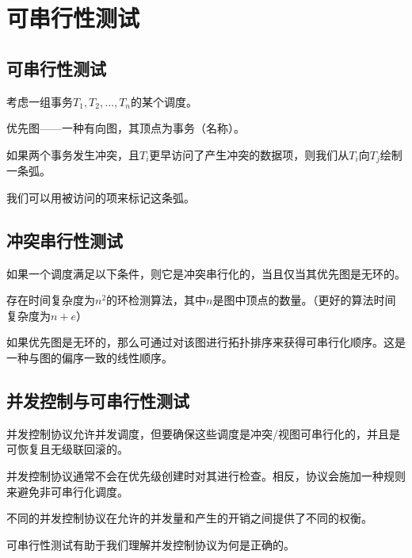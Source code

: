 \section{可串行性测试}
\subsection{可串行性测试}

考虑一组事务$T_1,T_2,...,T_n$的某个调度。

优先图——一种有向图，其顶点为事务（名称）。

如果两个事务发生冲突，且$T_i$更早访问了产生冲突的数据项，则我们从$T_i$向$T_j$绘制一条弧。

我们可以用被访问的项来标记这条弧。

\subsection{冲突串行性测试}

如果一个调度满足以下条件，则它是冲突串行化的，当且仅当其优先图是无环的。

存在时间复杂度为$n^2$的环检测算法，其中$n$是图中顶点的数量。（更好的算法时间复杂度为$n+e$）

如果优先图是无环的，那么可通过对该图进行拓扑排序来获得可串行化顺序。这是一种与图的偏序一致的线性顺序。

\subsection{并发控制与可串行性测试}

并发控制协议允许并发调度，但要确保这些调度是冲突/视图可串行化的，并且是可恢复且无级联回滚的。

并发控制协议通常不会在优先级创建时对其进行检查。相反，协议会施加一种规则来避免非可串行化调度。

不同的并发控制协议在允许的并发量和产生的开销之间提供了不同的权衡。

可串行性测试有助于我们理解并发控制协议为何是正确的。